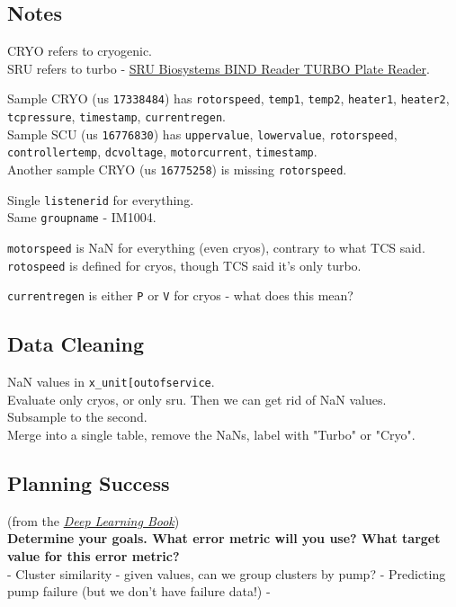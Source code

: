 \documentclass[11pt]{article}
\begin{document}
    \subsection{Notes}\label{notes}

CRYO refers to cryogenic.\\
SRU refers to turbo -
\href{https://www.labx.com/item/sru-biosystems-bind-reader-turbo-plate-reader/LV39187140}{SRU
Biosystems BIND Reader TURBO Plate Reader}.

Sample CRYO (us \texttt{17338484}) has \texttt{rotorspeed},
\texttt{temp1}, \texttt{temp2}, \texttt{heater1}, \texttt{heater2},
\texttt{tcpressure}, \texttt{timestamp}, \texttt{currentregen}.\\
Sample SCU (us \texttt{16776830}) has \texttt{uppervalue},
\texttt{lowervalue}, \texttt{rotorspeed}, \texttt{controllertemp},
\texttt{dcvoltage}, \texttt{motorcurrent}, \texttt{timestamp}.\\
Another sample CRYO (us \texttt{16775258}) is missing
\texttt{rotorspeed}.

Single \texttt{listenerid} for everything.\\
Same \texttt{groupname} - IM1004.

\texttt{motorspeed} is NaN for everything (even cryos), contrary to what
TCS said.\\
\texttt{rotospeed} is defined for cryos, though TCS said it's only
turbo.

\texttt{currentregen} is either \texttt{P} or \texttt{V} for cryos -
what does this mean?

    \subsection{Data Cleaning}\label{data-cleaning}

NaN values in
\texttt{x\_unit{[}\textquotesingle{}outofservice\textquotesingle{}{]}}.\\
Evaluate only cryos, or only sru. Then we can get rid of NaN values.\\
Subsample to the second.\\
Merge into a single table, remove the NaNs, label with "Turbo" or
"Cryo".

    \subsection{Planning Success}\label{planning-success}

(from the
\emph{\href{https://www.deeplearningbook.org/contents/guidelines.html}{Deep
Learning Book}})\\
\textbf{Determine your goals. What error metric will you use? What
target value for this error metric?}\\
- Cluster similarity - given values, can we group clusters by pump? -
Predicting pump failure (but we don't have failure data!) -
\end{document}
